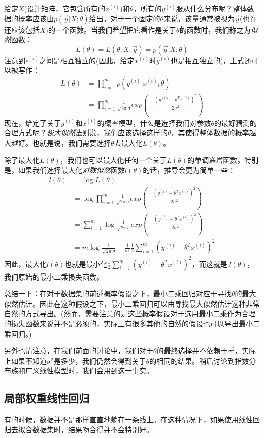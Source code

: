 给定$X$(设计矩阵，它包含所有的$x^{(i)}$)和$\theta$，所有的$y^{(i)}$服从什么分布呢？整体数据的概率应该由$p(\vec{y}|X;\theta)$给出，对于一个固定的$\theta$来说，该量通常被视为$\vec{y}$(也许还应该包括$X$)的一个函数。当我们希望把它看作是关于$\theta$的函数时，我们称之为\emph{似然}函数：
\begin{equation*}
L(\theta) = L(\theta;X,\vec{y}) = p(\vec{y}|X;\theta)
\end{equation*}
注意到$\epsilon^{(i)}$之间是相互独立的(因此，给定$x^{(i)}$时$y^{(i)}$也是相互独立的)，上式还可以被写作：
\begin{equation}
\begin{split}
L(\theta) &= \prod_{i = 1}^mp(y^{(i)}|x^{(i)};\theta) \\
&= \prod_{i = 1}^m\frac{1}{\sqrt{2\pi}\sigma}exp\left(-\frac{(y^{(i)} - \theta^Tx^{(i)})^2}{2\sigma^2}\right)
\end{split}
\end{equation}
现在，给定了关于$y^{(i)}$和$x^{(i)}$的概率模型，什么是选择我们对参数$\theta$的最好猜测的合理方式呢？\emph{极大似然}法则说，我们应该选择这样的$\theta$，其使得整体数据的概率越大越好。也就是说，我们需要选择$\theta$去最大化$L(\theta)$。

除了最大化$L(\theta)$，我们也可以最大化任何一个关于$L(\theta)$的单调递增函数。特别是，如果我们选择最大化\emph{对数似然}函数$l(\theta)$的话，推导会更为简单一些：
\begin{equation}
\begin{split}
l(\theta) &= \log{L(\theta)} \\
&= \log\prod_{i = 1}^m\frac{1}{\sqrt{2\pi}\sigma}exp\left(-\frac{(y^{(i)} - \theta^Tx^{(i)})^2}{2\sigma^2}\right) \\
&= \sum_{i = 1}^m\log\frac{1}{\sqrt{2\pi}\sigma}exp\left(-\frac{(y^{(i)} - \theta^Tx^{(i)})^2}{2\sigma^2}\right) \\
&= m\log\frac{1}{\sqrt{2\pi}\sigma} - \frac{1}{\sigma^2}\frac{1}{2}\sum_{i = 1}^m(y^{(i)} - \theta^Tx^{(i)})^2
\end{split}
\end{equation}
因此，最大化$l(\theta)$也就是最小化$\frac{1}{2}\sum_{i = 1}^m(y^{(i)} - \theta^Tx^{(i)})^2$，而这就是$J(\theta)$，我们原始的最小二乘损失函数。

总结一下：在对于数据集的前述概率假设之下，最小二乘回归对应于寻找$\theta$的最大似然估计。因此在这种假设之下，最小二乘回归可以由寻找最大似然估计这种非常自然的方式导出。(然而，需要注意的是这些概率假设对于选用最小二乘作为合理的损失函数来说并不是必须的，实际上有很多其他的自然的假设也可以导出最小二乘回归。)

另外也请注意，在我们前面的讨论中，我们对于$\theta$的最终选择并不依赖于$\sigma^2$，实际上如果不知道$\sigma^2$是多少，我们仍然会得到关于$\theta$的相同的结果。稍后讨论到指数分布族和广义线性模型时，我们会用到这一事实。

\subsection{局部权重线性回归}
有的时候，数据并不是那样直直地躺在一条线上。在这种情况下，如果使用线性回归去拟合数据集时，结果吻合得并不会特别好。

